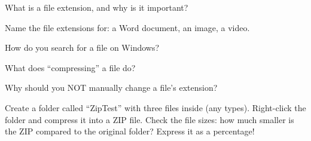 \begin{reviewqs}
  \item What is a file extension, and why is it important?
  \item Name the file extensions for: a Word document, an image, a video.
  \item How do you search for a file on Windows?
  \item What does ``compressing'' a file do?
  \item Why should you NOT manually change a file's extension?
\end{reviewqs}

\begin{challenge}
Create a folder called ``ZipTest'' with three files inside (any types). Right-click the folder and compress it into a ZIP file. Check the file sizes: how much smaller is the ZIP compared to the original folder? Express it as a percentage!
\end{challenge}
